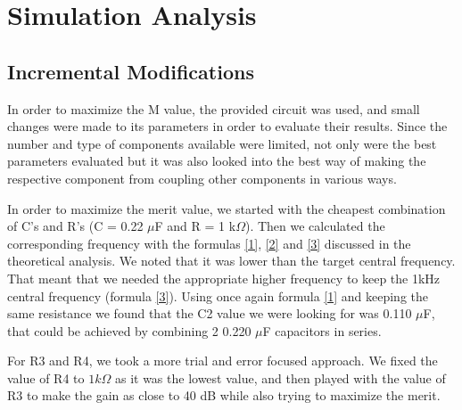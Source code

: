 \section{Simulation Analysis}
\label{sec:simulation analysis}

\subsection{Incremental Modifications}

\indent

In order to maximize the M value, the provided circuit was used, and small changes were made to its parameters in order to evaluate their results. Since the number and type of components available were limited, not only were the best parameters evaluated but it was also looked into the best way of making the respective component from coupling other components in various ways.

In order to maximize the merit value, we started with the cheapest combination of C's and R's (C = 0.22 $\mu$F and R = 1 k$\Omega$). Then we calculated the corresponding frequency with the formulas \ref{1}, \ref{2} and \ref{3} discussed in the theoretical analysis. We noted that it was lower than the target central frequency. That meant that we needed the appropriate higher frequency to keep the 1kHz central frequency (formula \ref{3}). Using once again formula \ref{1} and keeping the same resistance we found that the C2 value we were looking for was 0.110 $\mu$F, that could be achieved by combining 2 0.220 $\mu$F capacitors in series.


For R3 and R4, we took a more trial and error focused approach. We fixed the value of R4 to $1 k\Omega$ as it was the lowest value, and then played with the value of R3 to make the gain as close to 40 dB while also trying to maximize the merit.

